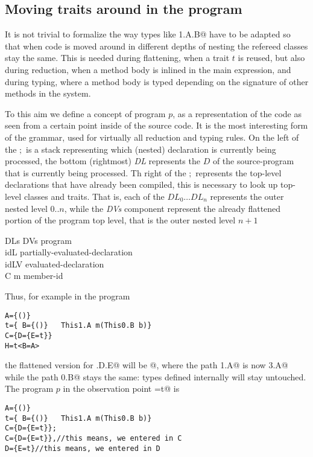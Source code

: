 \subsection{Moving traits around in the program}
It is not trivial to formalize the way types like \Q@This1.A.B@ %
have to be adapted so that when code is moved around in different depths of nesting the 
refereed classes stay the same.
This is needed during flattening, when a trait $t$ is reused, but also during reduction, when a method body is inlined in the main expression, and during typing, where a method body is typed depending on the signature of other methods in the system.

To this aim we define a concept of program $p$, as a representation of 
the code as seen from a certain point inside of the source code. It is the most interesting form of the grammar,
used for virtually all reduction and typing rules. On the left of the $;$ is a stack representing which (nested) declaration is currently being processed, the bottom (rightmost) \textit{DL} represents the $D$ of the source-program that is currently being processed. Th right of the $;$ represents the top-level declarations that have already been compiled, this is necessary to look up top-level classes and traits.
That is, each of the $\textit{DL}_0\ldots\textit{DL}_n$
represents the outer nested level $0..n$, while
the \textit{DVs} component represent the already flattened portion of the program top level, that is 
the outer nested level $n+1$

\begin{bnf}
      {DLs\Q{;} DVs}                                                     {program}\\     {id\eq{}L}                                                         {partially-evaluated-declaration}\\     {id\eq{}LV}                                                       {evaluated-declaration}\\    {C \mmid{} m}                                                      {member-id}%
\end{bnf}


Thus, for example in the program
\begin{lstlisting}
A={()}
t={ B={()}   This1.A m(This0.B b)}
C={D={E=t}}
H=t<B=A>
\end{lstlisting}
the flattened version for \Q@C.D.E@ will be 
@, where the path
\Q@This1.A@ is now \Q@This3.A@ while the path \Q@This0.B@ stays the same: types defined internally will
stay untouched.
The program $p$ in the observation point \Q@E=t@ is
\begin{lstlisting}
A={()}
t={ B={()}   This1.A m(This0.B b)}
C={D={E=t}};
C={D={E=t}},//this means, we entered in C
D={E=t}//this means, we entered in D
\end{lstlisting}

